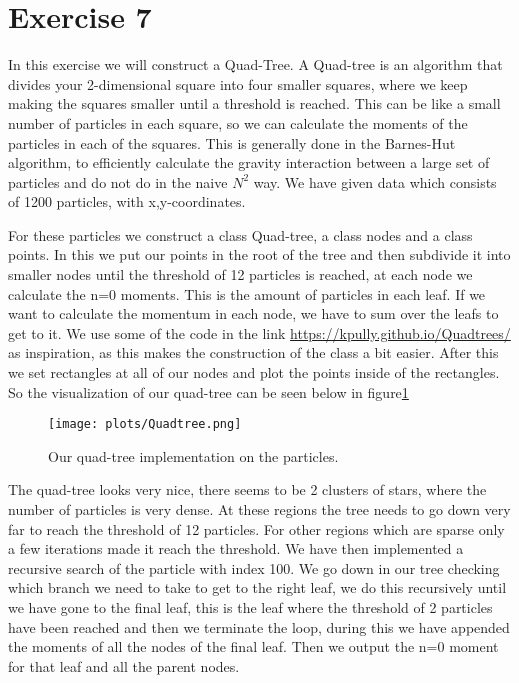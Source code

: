 \section{Exercise 7}
In this exercise we will construct a Quad-Tree. A Quad-tree is an algorithm that divides your 2-dimensional square into four smaller squares, where we keep making the squares smaller until a threshold is reached. This can be like a small number of particles in each square, so we can calculate the moments of the particles in each of the squares. This is generally done in the Barnes-Hut algorithm, to efficiently calculate the gravity interaction between a large set of particles and do not do in the naive $N^2$ way. We have given data which consists of 1200 particles, with x,y-coordinates.

For these particles we construct a class Quad-tree, a class nodes and a class points. In this we put our points in the root of the tree and then subdivide it into smaller nodes until the threshold of 12 particles is reached, at each node we calculate the n=0 moments. This is the amount of particles in each leaf. If we want to calculate the momentum in each node, we have to sum over the leafs to get to it. We use some of the code in the link \href{https://kpully.github.io/Quadtrees/}{https://kpully.github.io/Quadtrees/} as inspiration, as this makes the construction of the class a bit easier. After this we set rectangles at all of our nodes and plot the points inside of the rectangles. So the visualization of our quad-tree can be seen below in figure\ref{quadtree}

\begin{figure}[h]
   \centering
   \texttt{[image: plots/Quadtree.png]}
      \caption{Our quad-tree implementation on the particles.}
    \label{quadtree}
\end{figure}

The quad-tree looks very nice, there seems to be 2 clusters of stars, where the number of particles is very dense. At these regions the tree needs to go down very far to reach the threshold of 12 particles. For other regions which are sparse only a few iterations made it reach the threshold.
We have then implemented a recursive search of the particle with index 100. We go down in our tree checking which branch we need to take to get to the right leaf, we do this recursively until we have gone to the final leaf, this is the leaf where the threshold of 2 particles have been reached and then we terminate the loop, during this we have appended the moments of all the nodes of the final leaf. Then we output the n=0 moment for that leaf and all the parent nodes.



